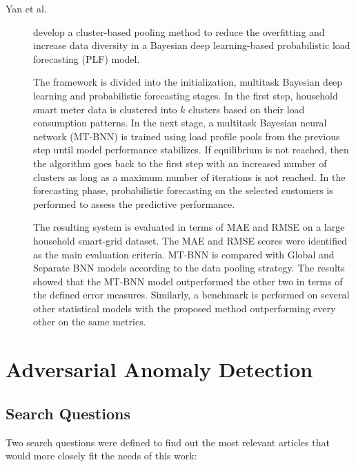 \begin{description}
    \item[Yan et al.]\cite{Yang.Li.ea_BayesianDeepLearningBased_2020} develop a cluster-based pooling method to reduce the overfitting and increase data diversity in a Bayesian deep learning-based probabilistic load forecasting (PLF) model. 
    
    The framework is divided into the initialization, multitask Bayesian deep learning and probabilistic forecasting stages. In the first step, household smart meter data is clustered into $k$ clusters based on their load consumption patterns. In the next stage, a multitask Bayesian neural network (MT-BNN) is trained using load profile pools from the previous step until model performance stabilizes. If equilibrium is not reached, then the algorithm goes back to the first step with an increased number of clusters as long as a maximum number of iterations is not reached. In the forecasting phase, probabilistic forecasting on the selected customers is performed to assess the predictive performance.

    The resulting system is evaluated in terms of MAE and RMSE on a large household smart-grid dataset. The MAE and RMSE scores were identified as the main evaluation criteria. MT-BNN is compared with Global and Separate BNN models according to the data pooling strategy. The results showed that the MT-BNN model outperformed the other two in terms of the defined error measures. Similarly, a benchmark is performed on several other statistical models with the proposed method outperforming every other on the same metrics. 
\end{description}

\section{Adversarial Anomaly Detection}\label{sec:sota_anomaly_detection}

\subsection{Search Questions}\label{sec:gan_search_questions}
Two search questions were defined to find out the most relevant articles that would more closely fit the needs of this work:


